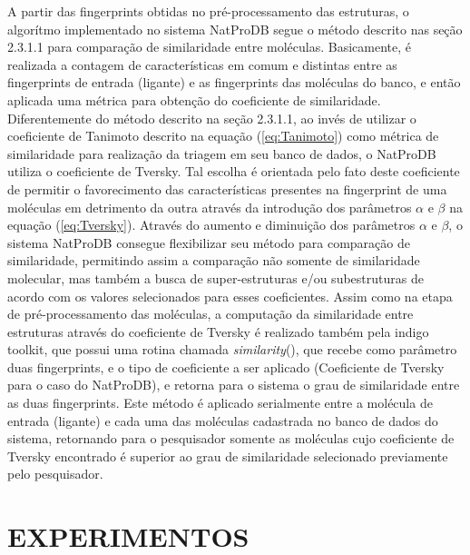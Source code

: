A partir das fingerprints obtidas no pré-processamento das estruturas, o algorítmo implementado no sistema NatProDB segue o método descrito nas seção 2.3.1.1 para comparação de similaridade entre moléculas. Basicamente, é realizada a contagem de características em comum e distintas entre as fingerprints de entrada (ligante) e as fingerprints das moléculas do banco, e então aplicada uma métrica para obtenção do coeficiente de similaridade. Diferentemente do método descrito na seção 2.3.1.1, ao invés de utilizar o coeficiente de Tanimoto  descrito na equação (\ref{eq:Tanimoto}) como métrica de similaridade para realização da triagem em seu banco de dados, o NatProDB utiliza o coeficiente de Tversky. Tal escolha é orientada pelo fato deste coeficiente de permitir o favorecimento das características presentes na fingerprint de uma moléculas em detrimento da outra através da introdução dos parâmetros $\alpha$ e $\beta$ na equação (\ref{eq:Tversky}). Através do aumento e diminuição dos parâmetros $\alpha$ e $\beta$, o sistema NatProDB consegue flexibilizar seu método para comparação de similaridade, permitindo assim a comparação não somente de similaridade molecular, mas também a busca de super-estruturas e/ou subestruturas de acordo com os valores selecionados para esses coeficientes. Assim como na etapa de pré-processamento das moléculas, a computação da similaridade entre estruturas através do coeficiente de Tversky é realizado também pela indigo toolkit, que possui uma rotina chamada \textit{similarity}(), que recebe como parâmetro duas fingerprints, e o tipo de coeficiente a ser aplicado (Coeficiente de Tversky para o caso do NatProDB), e retorna para o sistema o grau de similaridade entre as duas fingerprints. Este método é aplicado serialmente entre a molécula de entrada (ligante) e cada uma das moléculas cadastrada no banco de dados do sistema, retornando para o pesquisador somente as moléculas cujo coeficiente de Tversky encontrado é superior ao grau de similaridade selecionado previamente pelo pesquisador.  

\section{EXPERIMENTOS}

